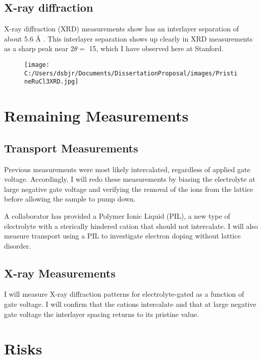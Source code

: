 \documentclass[11pt]{article}
\begin{document}
\subsection{X-ray diffraction}

X-ray diffraction (XRD) measurements show \rucl has an interlayer separation of about 5.6 \r{A} \cite{Schollhorn1983}. This interlayer separation shows up clearly in XRD measurements as a sharp peak near $2\theta = $ 15\degree, which I have observed here at Stanford.

\begin{figure}
 \centering
	{\texttt{[image: C:/Users/dsbjr/Documents/DissertationProposal/images/PristineRuCl3XRD.jpg]}\label{fig:f4}}
  \captionsetup{width=0.5\textwidth}
\end{figure}

\section{Remaining Measurements}

\subsection{Transport Measurements}

Previous measurements were most likely intercalated, regardless of applied gate voltage. Accordingly, I will redo these measurements by biasing the electrolyte at large negative gate voltage and verifying the removal of the ions from the lattice before allowing the sample to pump down.

A collaborator has provided a Polymer Ionic Liquid (PIL), a new type of electrolyte with a sterically hindered cation that should not intercalate. I will also measure transport using a PIL to investigate electron doping without lattice disorder.

\subsection{X-ray Measurements}

I will measure X-ray diffraction patterns for electrolyte-gated \rucl as a function of gate voltage. I will confirm that the cations intercalate and that at large negative gate voltage the interlayer spacing returns to its pristine value.

\section{Risks}
\end{document}
